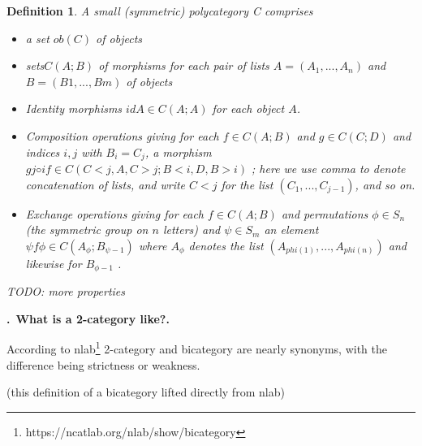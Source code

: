 \documentclass[11pt,noamsfonts]{amsart}
\newcommand{\pointheader}{\vspace{2mm}\noindent\refstepcounter{section}\textbf{\thesection.}}
\newcommand{\bpoint}[1]{\pointheader~{\bf #1.}}
\newtheorem{definition}[thm]{Definition}
\begin{document}
\begin{definition}
A small (symmetric) polycategory C comprises 
\begin{itemize}
\item a set \(ob(C )\) of objects
\item sets\( C (A; B)\) of morphisms for each pair of lists \(A = (A_1, . . . , A_n)\) and
\(B = (B1, . . . , Bm)\) of objects
\item Identity morphisms \(idA \in C (A; A)\) for each object \(A\).
\item Composition operations giving for each \(f \in C (A; B)\) and \(g \in C (C; D)\) and
indices \(i, j\) with \(B_i = C_j\), a morphism
\(g j◦i f \in C (C<j , A, C>j ; B<i, D, B>i)\) ;
here we use comma to denote concatenation of lists, and write \(C<j\) for the
list \((C_1, . . . , C_{j−1})\), and so on.
\item Exchange operations giving for each \(f \in C (A; B)\) and permutations \(\phi \in S_n\)
(the symmetric group on \(n\) letters) and \(\psi \in S_m\) an element
\(\psi f \phi  \in C (A_\phi; B_{\psi−1} )\)
where \(A_\phi\) denotes the list \((A_{phi(1)}, . . . , A_{phi(n)})\) and likewise for \(B_{\phi − 1}\) .
\end{itemize}

TODO: more properties

\end{definition}

\bpoint{What is a 2-category like?}


According to nlab\footnote{https://ncatlab.org/nlab/show/bicategory} 2-category and bicategory are nearly synonyms, with the difference being strictness or weakness. 

(this definition of a bicategory lifted directly from nlab)
\end{document}
